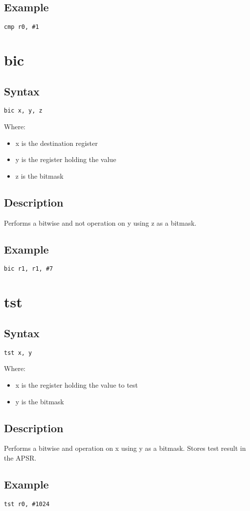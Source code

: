 \documentclass[11pt]{scrartcl}
\begin{document}
\subsection{Example}
\begin{verbatim}
cmp r0, #1
\end{verbatim}

\section{bic}
\subsection{Syntax}
\begin{verbatim}
bic x, y, z
\end{verbatim}
Where:
\begin{itemize}
    \item x is the destination register
    \item y is the register holding the value
    \item z is the bitmask
\end{itemize}
\subsection{Description}
Performs a bitwise and not operation on y using z as a bitmask.
\subsection{Example}
\begin{verbatim}
bic r1, r1, #7
\end{verbatim}

\section{tst}
\subsection{Syntax}
\begin{verbatim}
tst x, y
\end{verbatim}
Where:
\begin{itemize}
    \item x is the register holding the value to test
    \item y is the bitmask
\end{itemize}
\subsection{Description}
Performs a bitwise and operation on x using y as a bitmask. Stores test
result in the APSR.
\subsection{Example}
\begin{verbatim}
tst r0, #1024
\end{verbatim}
\end{document}
